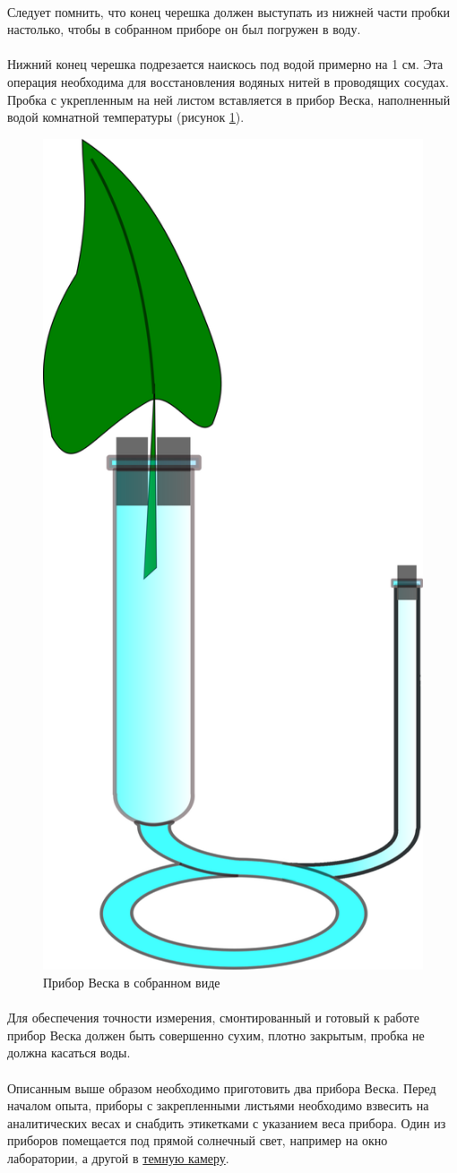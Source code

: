 \paragraph*{\warningsign}Следует помнить, что конец черешка должен выступать из нижней части пробки настолько, чтобы в собранном приборе он был погружен в воду. 

\paragraph*{}Нижний конец черешка подрезается наискось под водой примерно на 1 см. Эта операция необходима для восстановления водяных нитей в проводящих сосудах. Пробка с укрепленным на ней листом вставляется в прибор Веска, наполненный водой комнатной температуры (рисунок \ref{veska}).  

\begin{figure}[h]
  \centering
       \includegraphics[width=0.2\linewidth]{pictures/veska}
\caption{Прибор Веска в собранном виде}
\label{veska}
\end{figure}

\paragraph*{}Для обеспечения точности измерения, смонтированный и готовый к работе прибор Веска должен быть совершенно сухим, плотно закрытым, пробка не должна касаться воды.

\paragraph*{}Описанным выше образом необходимо приготовить два прибора Веска. Перед началом опыта, приборы с закрепленными листьями необходимо взвесить на аналитических весах и снабдить этикетками с указанием веса прибора. Один из приборов помещается под прямой солнечный свет, например на окно лаборатории, а другой в \hyperlink{light_dark_diferences}{темную камеру}. 

